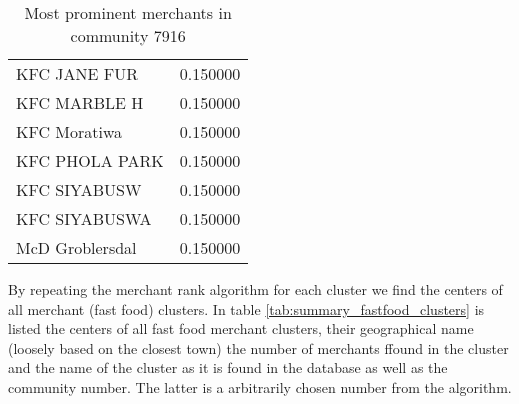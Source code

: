 \begin{center}
\begin{table}[]
\begin{tabular}{lr}
                KFC JANE FUR &  0.150000 \\
                KFC MARBLE H &  0.150000 \\
                KFC Moratiwa &  0.150000 \\
              KFC PHOLA PARK &  0.150000 \\
                KFC SIYABUSW &  0.150000 \\
               KFC SIYABUSWA &  0.150000 \\
             McD Groblersdal &  0.150000 \\
            \bottomrule
            \end{tabular}
        \caption{Most prominent merchants in community 7916}
        \label{tab:merchant_community_7916}
    \end{table}
\end{center}

By repeating the merchant rank algorithm for each cluster we find the centers of all merchant (fast food) clusters.  In table \ref{tab:summary_fastfood_clusters} is listed the centers of all fast food merchant clusters, their geographical name (loosely based on the closest town) the number of merchants ffound in the cluster and the name of the cluster as it is found in the database as well as the community number.  The latter is a arbitrarily chosen number from the algorithm.


